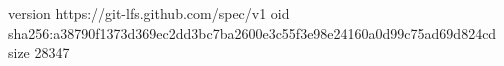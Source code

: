 version https://git-lfs.github.com/spec/v1
oid sha256:a38790f1373d369ec2dd3bc7ba2600e3c55f3e98e24160a0d99c75ad69d824cd
size 28347
